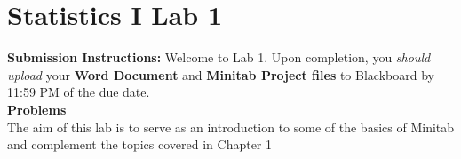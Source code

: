 \documentclass[12pt]{article}
\newcommand{\labnumber}[0]{1}
\begin{document}

\section*{Statistics I Lab  \labnumber \hspace{1in}}

\textbf{Submission Instructions:} Welcome to Lab 1. Upon completion, you \emph{should upload} your \textbf{Word Document} and \textbf{Minitab Project files} to Blackboard by 11:59 PM of the due date. \\

\noindent\textbf{Problems}
\\
The aim of this lab is to serve as an introduction to some of the basics of Minitab and complement the topics covered in Chapter 1
\end{document}
